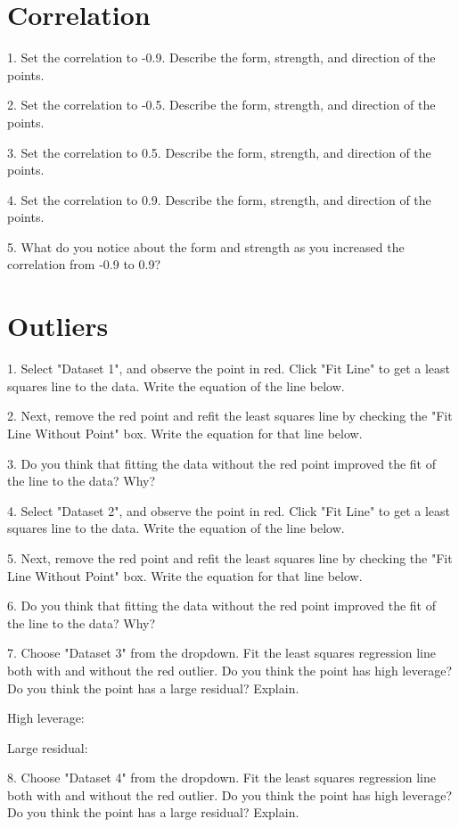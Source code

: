 \documentclass[11pt]{amsart}
\begin{document}
\section{Correlation}
1. Set the correlation to -0.9. Describe the form, strength, and direction of the points.

2. Set the correlation to -0.5. Describe the form, strength, and direction of the points.

3. Set the correlation to 0.5. Describe the form, strength, and direction of the points.

4. Set the correlation to 0.9. Describe the form, strength, and direction of the points.

5. What do you notice about the form and strength as you increased the correlation from -0.9 to 0.9?

\section{Outliers}

1. Select "Dataset 1", and observe the point in red. Click "Fit Line" to get a least squares line to the data. Write the equation of the line below.

2. Next, remove the red point and refit the least squares line by checking the "Fit Line Without Point" box.  Write the equation for that line below. 

3. Do you think that fitting the data without the red point improved the fit of the line to the data? Why?

4. Select "Dataset 2", and observe the point in red. Click "Fit Line" to get a least squares line to the data. Write the equation of the line below.

5. Next, remove the red point and refit the least squares line by checking the "Fit Line Without Point" box.  Write the equation for that line below. 

6. Do you think that fitting the data without the red point improved the fit of the line to the data? Why?

7. Choose "Dataset 3" from the dropdown. Fit the least squares regression line both with and without the red outlier. Do you think the point has high leverage? Do you think the point has a large residual? Explain.

High leverage:

Large residual:

8. Choose "Dataset 4" from the dropdown. Fit the least squares regression line both with and without the red outlier. Do you think the point has high leverage? Do you think the point has a large residual? Explain.
\end{document}
